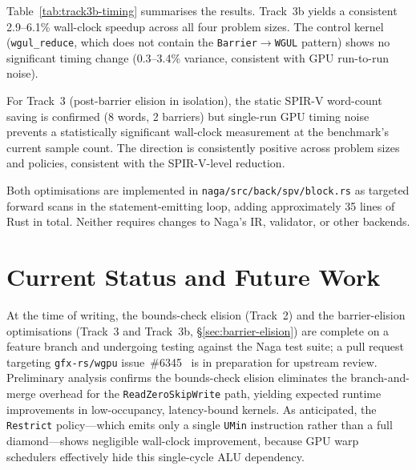 \documentclass[10pt,a4paper,twocolumn]{article}
\begin{document}
Table~\ref{tab:track3b-timing} summarises the results.  Track~3b yields a
consistent 2.9--6.1\% wall-clock speedup across all four problem sizes.  The
control kernel (\texttt{wgul\_reduce}, which does not contain the
\texttt{Barrier}$\rightarrow$\texttt{WGUL} pattern) shows no significant
timing change (0.3--3.4\% variance, consistent with GPU run-to-run noise).

For Track~3 (post-barrier elision in isolation), the static SPIR-V word-count
saving is confirmed (8 words, 2 barriers) but single-run GPU timing noise
prevents a statistically significant wall-clock measurement at the
benchmark's current sample count.  The direction is consistently positive
across problem sizes and policies, consistent with the SPIR-V-level reduction.

Both optimisations are implemented in \texttt{naga/src/back/spv/block.rs} as
targeted forward scans in the statement-emitting loop, adding approximately
35 lines of Rust in total.  Neither requires changes to Naga's IR, validator,
or other backends.

\section{Current Status and Future Work}

At the time of writing, the bounds-check elision (Track~2) and the barrier-elision
optimisations (Track~3 and Track~3b, \S\ref{sec:barrier-elision}) are complete
on a feature branch and undergoing testing against the Naga test suite; a pull
request targeting \texttt{gfx-rs/wgpu} issue~\#6345~\cite{issue6345} is in
preparation for upstream review.  Preliminary analysis confirms the bounds-check
elision eliminates the branch-and-merge overhead for the
\texttt{ReadZeroSkipWrite} path, yielding expected runtime improvements in
low-occupancy, latency-bound kernels.  As anticipated, the \texttt{Restrict}
policy---which emits only a single \texttt{UMin} instruction rather than a full
diamond---shows negligible wall-clock improvement, because GPU warp schedulers
effectively hide this single-cycle ALU dependency.
\end{document}
